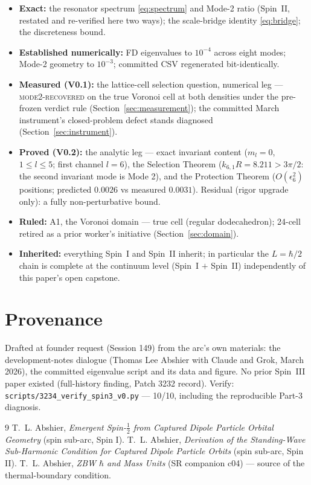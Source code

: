 \documentclass[12pt]{article}
\begin{document}
\begin{itemize}[leftmargin=2em]
\item \textbf{Exact:} the resonator spectrum \eqref{eq:spectrum} and
Mode-2 ratio (Spin~II, restated and re-verified here two ways); the
scale-bridge identity \eqref{eq:bridge}; the discreteness bound.
\item \textbf{Established numerically:} FD eigenvalues to $10^{-4}$
across eight modes; Mode-2 geometry to $10^{-3}$; committed CSV
regenerated bit-identically.
\item \textbf{Measured (V0.1):} the lattice-cell selection question,
numerical leg --- \textsc{mode2-recovered} on the true Voronoi cell at
both densities under the pre-frozen verdict rule
(Section~\ref{sec:measurement}); the committed March instrument's
closed-problem defect stands diagnosed (Section~\ref{sec:instrument}).
\item \textbf{Proved (V0.2):} the analytic leg --- exact invariant
content ($m_l = 0$, $1\le l\le5$; first channel $l=6$), the Selection
Theorem ($k_{6,1}R = 8.211 > 3\pi/2$: the second invariant mode is
Mode 2), and the Protection Theorem ($O(\epsilon_6^2)$ positions;
predicted $0.0026$ vs measured $0.0031$).  Residual (rigor upgrade
only): a fully non-perturbative bound.
\item \textbf{Ruled:} A1, the Voronoi domain --- true cell (regular
dodecahedron); 24-cell retired as a prior worker's initiative
(Section~\ref{sec:domain}).
\item \textbf{Inherited:} everything Spin~I and Spin~II inherit; in
particular the $L = \hbar/2$ chain is complete at the continuum level
(Spin~I $+$ Spin~II) independently of this paper's open capstone.
\end{itemize}

\section*{Provenance}

Drafted at founder request (Session 149) from the arc's own materials:
the development-notes dialogue (Thomas Lee Abshier with Claude and
Grok, March 2026), the committed eigenvalue script and its data and
figure.  No prior Spin~III paper existed (full-history finding,
Patch 3232 record).  Verify:
\texttt{scripts/3234\_verify\_spin3\_v0.py} --- 10/10, including the
reproducible Part-3 diagnosis.

\begin{thebibliography}{9}
 T.~L. Abshier, \emph{Emergent Spin-$\tfrac12$ from
Captured Dipole Particle Orbital Geometry} (spin sub-arc, Spin I).
 T.~L. Abshier, \emph{Derivation of the Standing-Wave
Sub-Harmonic Condition for Captured Dipole Particle Orbits} (spin
sub-arc, Spin II).
 T.~L. Abshier, \emph{ZBW $\hbar$ and Mass Units}
(SR companion c04) --- source of the thermal-boundary condition.
\end{thebibliography}
\end{document}
